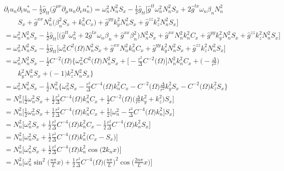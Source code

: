 \documentclass[english]{article}
\begin{document}
\begin{align*}
 & \partial_{t}u_{n}\partial_{t}u^{*}_{n}-\frac{1}{2}\hat{g}_{tt}\biggl(\hat{g}^{\mu\nu}\partial_{\mu}u_{n}\partial_{\nu}u^{*}_{n}\biggr)=\omega^{2}_{n}N^{2}_{n}S_{x}-\frac{1}{2}\hat{g}_{tt}\biggl[\hat{g}^{tt}\omega^{2}_{n}N^{2}_{n}S_{x}+2\hat{g}^{tx}\omega_{n}\beta_{n}N^{2}_{n}\\
 & \qquad S_{x}+\hat{g}^{xx}N^{2}_{n}\biggl(\beta^{2}_{n}S_{x}+k^{2}_{n}C_{x}\biggr)+\hat{g}^{yy}k^{2}_{y}N^{2}_{n}S_{x}+\hat{g}^{zz}k^{2}_{z}N^{2}_{n}S_{x}\biggr]\\
 & =\omega^{2}_{n}N^{2}_{n}S_{x}-\frac{1}{2}\hat{g}_{tt}\biggl[\biggl(\hat{g}^{tt}\omega^{2}_{n}+2\hat{g}^{tx}\omega_{n}\beta_{n}+\hat{g}^{xx}\beta^{2}_{n}\biggr)N^{2}_{n}S_{x}+\hat{g}^{xx}N^{2}_{n}k^{2}_{n}C_{x}+\hat{g}^{yy}k^{2}_{y}N^{2}_{n}S_{x}+\hat{g}^{zz}k^{2}_{z}N^{2}_{n}S_{x}\biggr]\\
 & =\omega^{2}_{n}N^{2}_{n}S_{x}-\frac{1}{2}\hat{g}_{tt}\biggl[\omega^{2}_{n}C^{2}\biggl(\Omega\biggr)N^{2}_{n}S_{x}+\hat{g}^{xx}N^{2}_{n}k^{2}_{n}C_{x}+\hat{g}^{yy}k^{2}_{y}N^{2}_{n}S_{x}+\hat{g}^{zz}k^{2}_{z}N^{2}_{n}S_{x}\biggr]\\
 & =\omega^{2}_{n}N^{2}_{n}S_{x}-\frac{1}{2}C^{-2}\biggl(\Omega\biggr)\biggl\{\omega^{2}_{n}C^{2}\biggl(\Omega\biggr)N^{2}_{n}S_{x}+\biggl[-\frac{r^{2}}{\Delta}C^{-2}\biggl(\Omega\biggr)\biggr]N^{2}_{n}k^{2}_{n}C_{x}+\biggl(-\frac{\Delta}{r^{2}}\biggr)\\
 & \qquad k^{2}_{y}N^{2}_{n}S_{x}+\biggl(-1\biggr)k^{2}_{z}N^{2}_{n}S_{x}\biggr\}\\
 & =\omega^{2}_{n}N^{2}_{n}S_{x}-\frac{1}{2}N^{2}_{n}\biggl\{\omega^{2}_{n}S_{x}-\frac{r^{2}}{\Delta}C^{-4}\biggl(\Omega\biggr)k^{2}_{n}C_{x}-C^{-2}\biggl(\Omega\biggr)\frac{\Delta}{r^{2}}k^{2}_{y}S_{x}-C^{-2}\biggl(\Omega\biggr)k^{2}_{z}S_{x}\biggr\}\\
 & =N^{2}_{n}\biggl[\frac{1}{2}\omega^{2}_{n}S_{x}+\frac{1}{2}\frac{r^{2}}{\Delta}C^{-4}\biggl(\Omega\biggr)k^{2}_{n}C_{x}+\frac{1}{2}C^{-2}\biggl(\Omega\biggr)\biggl(\frac{\Delta}{r^{2}}k^{2}_{y}+k^{2}_{z}\biggr)S_{x}\biggr]\\
 & =N^{2}_{n}\biggl[\frac{1}{2}\omega^{2}_{n}S_{x}+\frac{1}{2}\frac{r^{2}}{\Delta}C^{-4}\biggl(\Omega\biggr)k^{2}_{n}C_{x}+\frac{1}{2}\biggl[\omega^{2}_{n}-\frac{r^{2}}{\Delta}C^{-4}\biggl(\Omega\biggr)k^{2}_{n}\biggr]S_{x}\biggr]\\
 & =N^{2}_{n}\biggl[\omega^{2}_{n}S_{x}+\frac{1}{2}\frac{r^{2}}{\Delta}C^{-4}\biggl(\Omega\biggr)k^{2}_{n}C_{x}-\frac{1}{2}\frac{r^{2}}{\Delta}C^{-4}\biggl(\Omega\biggr)k^{2}_{n}S_{x}\biggr]\\
 & =N^{2}_{n}\biggl[\omega^{2}_{n}S_{x}+\frac{1}{2}\frac{r^{2}}{\Delta}C^{-4}\biggl(\Omega\biggr)k^{2}_{n}\biggl(C_{x}-S_{x}\biggr)\biggr]\\
 & =N^{2}_{n}\biggl[\omega^{2}_{n}S_{x}+\frac{1}{2}\frac{r^{2}}{\Delta}C^{-4}\biggl(\Omega\biggr)k^{2}_{n}\cos\biggl(2k_{n}x\biggr)\biggr]\\
 & =N^{2}_{n}\biggl[\omega^{2}_{n}\sin^{2}\biggl(\frac{n\pi}{L}x\biggr)+\frac{1}{2}\frac{r^{2}}{\Delta}C^{-4}\biggl(\Omega\biggr)\biggl(\frac{n\pi}{L}\biggr)^{2}\cos\biggl(\frac{2n\pi}{L}x\biggr)\biggr]
\end{align*}
\end{document}
